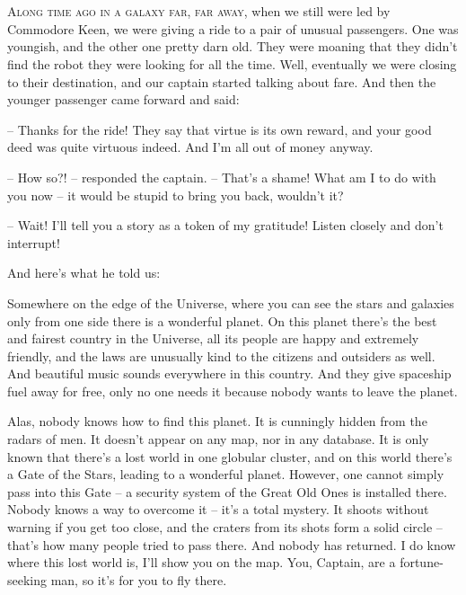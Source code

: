 \documentclass[ebook,twoside,final,openright]{memoir}
\begin{document}
\chapter{}
\par
\lettrine{A}{long time ago in a galaxy far, far away,} when we still were led by Commodore Keen, we were giving a ride to a pair of unusual passengers. One was youngish, and the other one pretty darn old. They were moaning that they didn’t find the robot they were looking for all the time. Well, eventually we were closing to their destination, and our captain started talking about fare. And then the younger passenger came forward and said: \par
\par
– Thanks for the ride! They say that virtue is its own reward, and your good deed was quite virtuous indeed. And I’m all out of money anyway.\par
– How so?! – responded the captain. – That's a shame! What am I to do with you now – it would be stupid to bring you back, wouldn’t it? \par
– Wait! I'll tell you a story as a token of my gratitude! Listen closely and don’t interrupt! \par
 And here’s what he told us:\par
\par
Somewhere on the edge of the Universe, where you can see the stars and galaxies only from one side there is a wonderful planet. On this planet there’s the best and fairest country in the Universe, all its people are happy and extremely friendly, and the laws are unusually kind to the citizens and outsiders as well. And beautiful music sounds everywhere in this country. And they give spaceship fuel away for free, only no one needs it because nobody wants to leave the planet. \par
Alas, nobody knows how to find this planet. It is cunningly hidden from the radars of men. It doesn’t appear on any map, nor in any database. It is only known that there’s a lost world in one globular cluster, and on this world there’s a Gate of the Stars, leading to a wonderful planet. However, one cannot simply pass into this Gate – a security system of the Great Old Ones is installed there. Nobody knows a way to overcome it – it’s a total mystery. It shoots without warning if you get too close, and the craters from its shots form a solid circle – that's how many people tried to pass there. And nobody has returned. I do know where this lost world is, I'll show you on the map. You, Captain, are a fortune-seeking man, so it’s for you to fly there.\par
\end{document}
